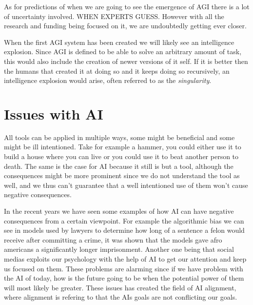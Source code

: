\documentclass{report}
\theoremstyle{definition}
\begin{document}
As for predictions of when we are going to see the emergence of AGI there is a lot of uncertainty involved. WHEN EXPERTS GUESS. However with all the research and funding being focused on it, we are undoubtedly getting ever closer. 


When the first AGI system has been created we will likely see an intelligence explosion. Since AGI is defined to be able to solve an arbitrary amount of task, this would also include the creation of newer versions of it self. If it is better then the humans that created it at doing so and it keeps doing so recursively, an intelligence explosion would arise, often referred to as the \textit{singularity}.

\section{Issues with AI}
All tools can be applied in multiple ways, some might be beneficial and some might be ill intentioned. Take for example a hammer, you could either use it to build a house where you can live or you could use it to beat another person to death. The same is the case for AI because it still is but a tool, although the consequences might be more prominent since we do not understand the tool as well, and we thus can't guarantee that a well intentioned use of them won't cause negative consequences. 

In the recent years we have seen some examples of how AI can have negative consequences from a certain viewpoint. For example the algorithmic bias we can see in models used by lawyers to determine how long of a sentence a felon would receive after committing a crime, it was shown that the models gave afro americans a significantly longer imprisonment. Another one being that social medias exploits our psychology with the help of AI to get our attention and keep us focused on them. These problems are alarming since if we have problem with the AI of today, how is the future going to be when the potential power of them will most likely be greater. These issues has created the field of AI alignment, where alignment is refering to that the AIs goals are not conflicting our goals. 
\end{document}
